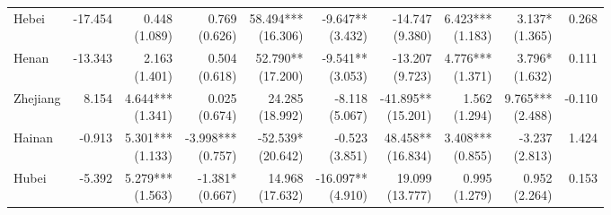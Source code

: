 \documentclass[12pt]{article}
\begin{document}
\begin{landscape}
\begin{small}
\begin{longtable}{lrrrrrrrrr}
    Hebei & -17.454 & \makecell[r]{0.448\\(1.089)} & \makecell[r]{0.769\\(0.626)} & \makecell[r]{58.494***\\(16.306)} & \makecell[r]{-9.647**\\(3.432)} & \makecell[r]{-14.747\\(9.380)} & \makecell[r]{6.423***\\(1.183)} & \makecell[r]{3.137*\\(1.365)} & 0.268 \\
    Henan & -13.343 & \makecell[r]{2.163\\(1.401)} & \makecell[r]{0.504\\(0.618)} & \makecell[r]{52.790**\\(17.200)} & \makecell[r]{-9.541**\\(3.053)} & \makecell[r]{-13.207\\(9.723)} & \makecell[r]{4.776***\\(1.371)} & \makecell[r]{3.796*\\(1.632)} & 0.111 \\
    Zhejiang & 8.154 & \makecell[r]{4.644***\\(1.341)} & \makecell[r]{0.025\\(0.674)} & \makecell[r]{24.285\\(18.992)} & \makecell[r]{-8.118\\(5.067)} & \makecell[r]{-41.895**\\(15.201)} & \makecell[r]{1.562\\(1.294)} & \makecell[r]{9.765***\\(2.488)} & -0.110 \\
    Hainan & -0.913 & \makecell[r]{5.301***\\(1.133)} & \makecell[r]{-3.998***\\(0.757)} & \makecell[r]{-52.539*\\(20.642)} & \makecell[r]{-0.523\\(3.851)} & \makecell[r]{48.458**\\(16.834)} & \makecell[r]{3.408***\\(0.855)} & \makecell[r]{-3.237\\(2.813)} & 1.424 \\
    Hubei & -5.392 & \makecell[r]{5.279***\\(1.563)} & \makecell[r]{-1.381*\\(0.667)} & \makecell[r]{14.968\\(17.632)} & \makecell[r]{-16.097**\\(4.910)} & \makecell[r]{19.099\\(13.777)} & \makecell[r]{0.995\\(1.279)} & \makecell[r]{0.952\\(2.264)} & 0.153 \\

\end{longtable}
\end{small}
\end{landscape}
\end{document}
